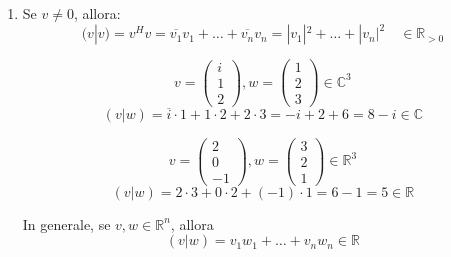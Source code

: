 \documentclass[a4paper]{article}
\theoremstyle{break}
\theoremstyle{break}
\theoremstyle{break}
\theoremstyle{break}
\begin{document}
\begin{enumerate}
  \item Se \( v \neq 0 \), allora:
    \[
      (v|v) = v^Hv = \overline{v_1}v_1 + \ldots + \overline{v_n}v_n = |v_1|^2 + \ldots + |v_n|^2
      \quad \in \mathbb{R}_{> 0}
    \] 
    \begin{example}
      \[
      v = \begin{pmatrix} 
        i\\
        1\\
        2
      \end{pmatrix} 
      ,
      w = \begin{pmatrix} 
        1\\
        2\\
        3
      \end{pmatrix} 
      \in \mathbb{C}^3
      \] 
      \[
        (v|w) = \overline{i} \cdot 1 + 1 \cdot 2 + 2 \cdot 3 = -i + 2 + 6 = 8 - i \in \mathbb{C}
      \] 
    \end{example}
    \begin{example}
      \[
      v = \begin{pmatrix} 
        2\\
        0\\
        -1
      \end{pmatrix} ,
      w = \begin{pmatrix} 
        3\\
        2\\
        1
      \end{pmatrix} 
      \in \mathbb{R}^3
      \] 
      \vspace{1em}
      \[
        (v|w) = 2 \cdot 3 + 0 \cdot 2 + (-1) \cdot 1 = 6 - 1 = 5 \in \mathbb{R}
      \] 
    \end{example}
    In generale, se \( v,w \in \mathbb{R}^n \), allora
    \[
      (v|w) = v_1w_1 + \ldots + v_nw_n \in \mathbb{R}
    \] 
\end{enumerate}
\end{document}
